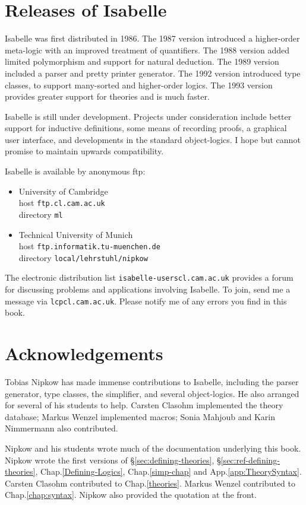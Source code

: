 \section*{Releases of Isabelle}
Isabelle was first distributed in 1986.  The 1987 version introduced a
higher-order meta-logic with an improved treatment of quantifiers.  The
1988 version added limited polymorphism and support for natural deduction.
The 1989 version included a parser and pretty printer generator.  The 1992
version introduced type classes, to support many-sorted and higher-order
logics.  The 1993 version provides greater support for theories and is
much faster.  

Isabelle is still under development.  Projects under consideration include
better support for inductive definitions, some means of recording proofs, a
graphical user interface, and developments in the standard object-logics.
I hope but cannot promise to maintain upwards compatibility.

Isabelle is available by anonymous ftp:
\begin{itemize}
\item University of Cambridge\\
        host {\tt ftp.cl.cam.ac.uk}\\
        directory {\tt ml}

\item Technical University of Munich\\
        host {\tt ftp.informatik.tu-muenchen.de}\\
        directory {\tt local/lehrstuhl/nipkow}
\end{itemize}
The electronic distribution list {\tt isabelle-users\at cl.cam.ac.uk}
provides a forum for discussing problems and applications involving
Isabelle.  To join, send me a message via {\tt lcp\at cl.cam.ac.uk}.
Please notify me of any errors you find in this book.

\section*{Acknowledgements} 
Tobias Nipkow has made immense contributions to Isabelle, including the
parser generator, type classes, the simplifier, and several object-logics.
He also arranged for several of his students to help.  Carsten Clasohm
implemented the theory database; Markus Wenzel implemented macros; Sonia
Mahjoub and Karin Nimmermann also contributed.  

Nipkow and his students wrote much of the documentation underlying this
book.  Nipkow wrote the first versions of \S\ref{sec:defining-theories},
\S\ref{sec:ref-defining-theories}, Chap.\ts\ref{Defining-Logics},
Chap.\ts\ref{simp-chap} and App.\ts\ref{app:TheorySyntax}\@.  Carsten
Clasohm contributed to Chap.\ts\ref{theories}.  Markus Wenzel contributed
to Chap.\ts\ref{chap:syntax}.  Nipkow also provided the quotation at
the front.


